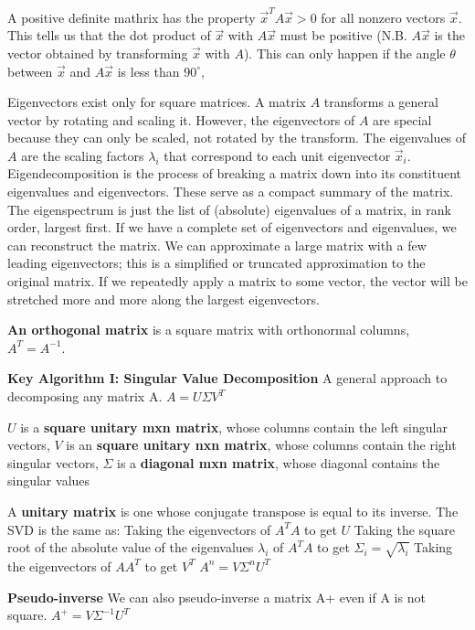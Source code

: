 \documentclass{article}
\begin{document}
\noindent A positive definite mathrix has the property $\vec{x}^T A \vec{x} > 0$ for all nonzero vectors $\vec{x}$.
This tells us that the dot product of $\vec{x}$ with $A \vec{x}$ must be positive
(N.B. $A \vec{x}$ is the vector obtained by transforming $\vec{x}$ with $A$).
This can only happen if the angle $\theta$ between $\vec{x}$ and $A \vec{x}$ is less than $90^\circ$,

\noindent Eigenvectors exist only for square matrices.
A matrix $A$ transforms a general vector by rotating and scaling it.
However, the eigenvectors of $A$ are special because they can only be scaled, not rotated by the transform.
The eigenvalues of $A$ are the scaling factors $\lambda_i$ that correspond to each unit eigenvector $\vec{x}_i$.
Eigendecomposition is the process of breaking a matrix down into its constituent eigenvalues
and eigenvectors. These serve as a compact summary of the matrix.
The eigenspectrum is just the list of (absolute) eigenvalues of a matrix, in rank order, largest first.
If we have a complete set of eigenvectors and eigenvalues, we can reconstruct the matrix.
We can approximate a large matrix with a few leading eigenvectors; this is a simplified or
truncated approximation to the original matrix.
If we repeatedly apply a matrix to some vector, the vector will be stretched more and more
along the largest eigenvectors.

\noindent \textbf{An orthogonal matrix} is a square matrix with orthonormal columns, $A^T = A^{-1}$.

\noindent \textbf{Key Algorithm I\@: Singular Value Decomposition}
A general approach to decomposing any matrix A.
$A = U \Sigma V^T$

\noindent $U$ is a \textbf{square unitary mxn matrix}, whose columns contain the left singular vectors,
$V$ is an \textbf{square unitary nxn matrix}, whose columns contain the right singular vectors,
$\Sigma$ is a \textbf{diagonal mxn matrix}, whose diagonal contains the singular values

\noindent A \textbf{unitary matrix} is one whose conjugate transpose is equal to its inverse.
The SVD is the same as:
Taking the eigenvectors of $A^T A$ to get $U$
Taking the square root of the absolute value of the eigenvalues $\lambda_i$ of $A^T A$ to get $\Sigma_i = \sqrt{\lambda_i}$
Taking the eigenvectors of $A A^T$ to get $V^T$
$A^n = V \Sigma^n U^T$

\noindent \textbf{Pseudo-inverse}
We can also pseudo-inverse a matrix A+ even if A is not square.
$A^+ = V \Sigma^{-1} U^T$
\end{document}
